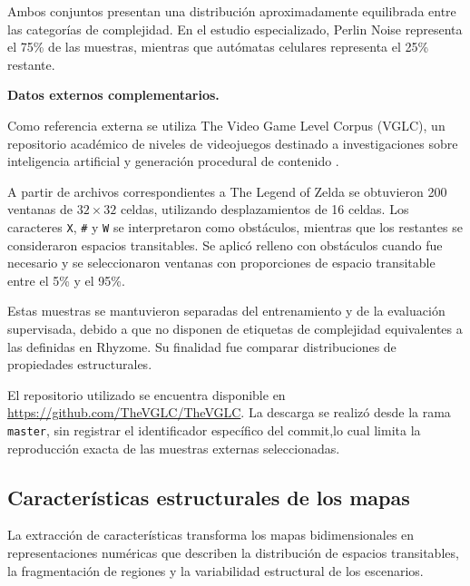 \FloatBarrier

Ambos conjuntos presentan una distribución aproximadamente equilibrada entre las categorías de complejidad. En el estudio especializado, Perlin Noise representa el 75\% de las muestras, mientras que autómatas celulares representa el 25\% restante.

\textbf{Datos externos complementarios.}

Como referencia externa se utiliza The Video Game Level Corpus (VGLC), un repositorio académico de niveles de videojuegos destinado a investigaciones sobre inteligencia artificial y generación procedural de contenido \parencite{summerville2016}.

A partir de archivos correspondientes a The Legend of Zelda se obtuvieron 200 ventanas de $32 \times 32$ celdas, utilizando desplazamientos de 16 celdas. Los caracteres \texttt{X}, \texttt{\#} y \texttt{W} se interpretaron como obstáculos, mientras que los restantes se consideraron espacios transitables. Se aplicó relleno con obstáculos cuando fue necesario y se seleccionaron ventanas con proporciones de espacio transitable entre el 5\% y el 95\%.

Estas muestras se mantuvieron separadas del entrenamiento y de la evaluación supervisada, debido a que no disponen de etiquetas de complejidad equivalentes a las definidas en Rhyzome. Su finalidad fue comparar distribuciones de propiedades estructurales.

El repositorio utilizado se encuentra disponible en \url{https://github.com/TheVGLC/TheVGLC}. La descarga se realizó desde la rama \texttt{master}, sin registrar el identificador específico del commit,lo cual limita la reproducción exacta de las muestras externas seleccionadas.


\subsection{Características estructurales de los mapas}
\label{subsec:caracteristicas_estructurales}

La extracción de características transforma los mapas bidimensionales en representaciones numéricas que describen la distribución de espacios transitables, la fragmentación de regiones y la variabilidad estructural de los escenarios.

